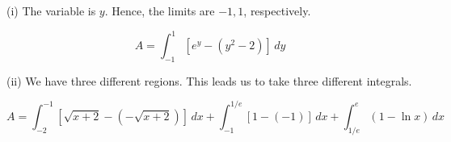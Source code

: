\documentclass{article}
\begin{document}
\hfill

\noindent (i) The variable is $y$. Hence, the limits are $-1, 1$, respectively.

\begin{equation*}
A = \int_{-1}^1\left[ e^y - (y^2-2) \right] \,dy
\end{equation*}

\hfill

\noindent (ii) We have three different regions. This leads us to take three different integrals.

\begin{equation*}
A = \int_{-2}^{-1}\left[ \sqrt{x+2} - (-\sqrt{x+2}) \right] \,dx +\int_{-1}^{1/e}\left[1-(-1) \right] \,dx + \int_{1/e}^{e}\left(1 -\ln x \right) \,dx
\end{equation*}
\end{document}
